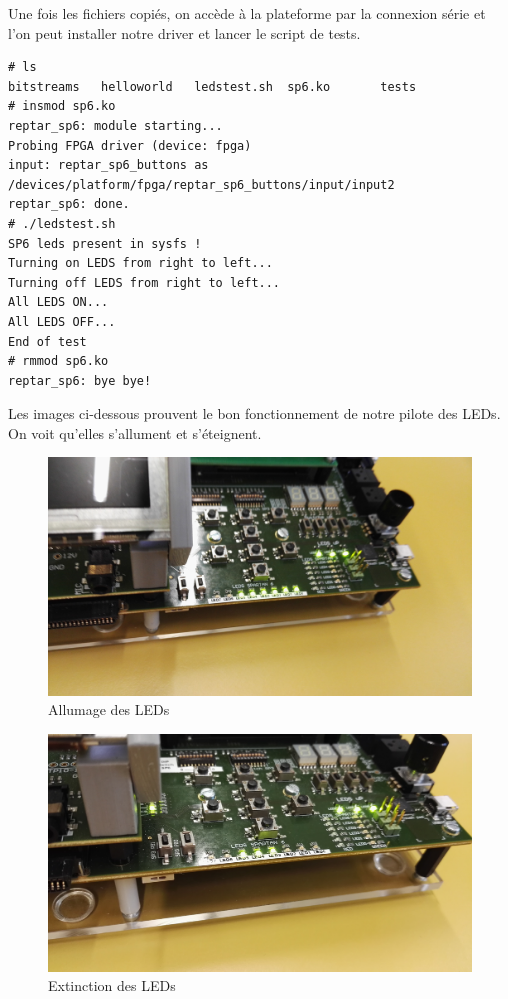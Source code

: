 Une fois les fichiers copiés, on accède à la plateforme par la connexion série et l'on peut installer notre driver et lancer le script de tests.
\begin{lstlisting}
# ls
bitstreams   helloworld   ledstest.sh  sp6.ko       tests
# insmod sp6.ko 
reptar_sp6: module starting...
Probing FPGA driver (device: fpga)
input: reptar_sp6_buttons as /devices/platform/fpga/reptar_sp6_buttons/input/input2
reptar_sp6: done.
# ./ledstest.sh 
SP6 leds present in sysfs !
Turning on LEDS from right to left...
Turning off LEDS from right to left...
All LEDS ON...
All LEDS OFF...
End of test
# rmmod sp6.ko 
reptar_sp6: bye bye!
\end{lstlisting}
Les images ci-dessous prouvent le bon fonctionnement de notre pilote des LEDs. On voit qu'elles s'allument et s'éteignent.
\begin{figure}[H]
	\begin{center}
		\includegraphics[width=17cm]{img/driverLeds3.png}
		\caption{Allumage des LEDs}
		\label{driverLed2}
	\end{center}
\end{figure}
\begin{figure}[H]
	\begin{center}
		\includegraphics[width=17cm]{img/driverLeds2.png}
		\caption{Extinction des LEDs}
		\label{driverLed}
	\end{center}
\end{figure}
